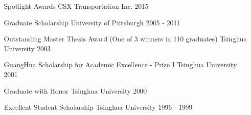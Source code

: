 
\begin{cvhonors}

\cvhonor
{} %
{Spotlight Awards} %
{CSX Transportation Inc.} %
{2015} %


\cvhonor
{} %
{Graduate Scholarship} %
{University of Pittsburgh} %
{2005 - 2011} %

\cvhonor
{} %
{Outstanding Master Thesis Award (One of 3 winners in 110 graduates)} %
{Tsinghua University} %
{2003} %


\cvhonor
{} %
{GuangHua Scholarship for Academic Excellence - Prize I} %
{Tsinghua University} %
{2001} %


\cvhonor
{} %
{Graduate with Honor} %
{Tsinghua University} %
{2000} %

\cvhonor
{} %
{Excellent Student Scholarship} %
{Tsinghua University} %
{1996 - 1999} %


\end{cvhonors}




